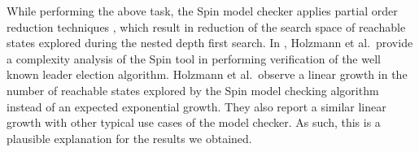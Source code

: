 \documentclass[journal, compsoc]{IEEEtran}
\begin{document}
	While performing the above task, the Spin model checker  applies partial order reduction techniques \cite{Peled1994}, which result in reduction of the search space of reachable states explored during the nested depth first search. In  \cite{Holzmann:1997:MCS:260897.260902}, Holzmann et al.\ provide a complexity analysis of the Spin tool in performing verification of the well known leader election algorithm. Holzmann et al.\ observe a linear growth in the number of reachable states explored by the Spin model checking algorithm instead of an expected exponential growth. They also report a similar linear growth with other typical use cases of the model checker. As such, this is a plausible explanation for the results we obtained.  
	
	
	
\end{document}
